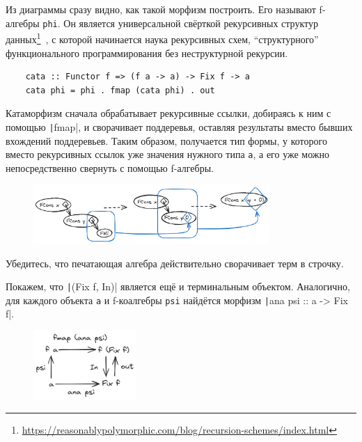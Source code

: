 Из диаграммы сразу видно, как такой морфизм построить.
Его называют  f-алгебры \texttt{phi}.
Он является универсальной свёрткой рекурсивных структур данных\footnote{\url{https://reasonablypolymorphic.com/blog/recursion-schemes/index.html}}~\cite{meijer1991functional, meijer1995bananas}, с которой начинается наука рекурсивных схем, ``структурного'' функционального программирования без неструктурной рекурсии.
\begin{verbatim}
    cata :: Functor f => (f a -> a) -> Fix f -> a
    cata phi = phi . fmap (cata phi) . out
\end{verbatim}

Катаморфизм сначала обрабатывает рекурсивные ссылки, добираясь к ним с помощью \texttt|fmap|, и сворачивает поддеревья, оставляя результаты вместо бывших вхождений поддеревьев.
Таким образом, получается тип формы, у которого вместо рекурсивных ссылок уже значения нужного типа \texttt{a}, а его уже можно непосредственно свернуть с помощью f-алгебры.

\begin{figure}[h]
    \centering
    \includegraphics[width=0.8\textwidth]{figs/cataStep.excalidraw}
\end{figure}

\begin{task}
    Убедитесь, что печатающая алгебра действительно сворачивает терм в строчку.
\end{task}

Покажем, что \texttt|(Fix f, In)| является ещё и терминальным объектом.
Аналогично, для каждого объекта \texttt{a} и f-коалгебры \texttt{psi} найдётся морфизм \texttt|ana psi :: a -> Fix f|.
\begin{figure}[h!]
    \centering
    \includegraphics[width=0.35\textwidth]{figs/ana}
\end{figure}

